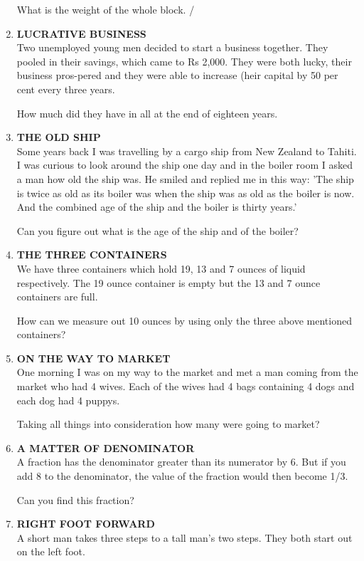 \documentclass[12pt]{article}
\begin{document}
\begin{enumerate}
What is the weight  of the whole  block.  / 
%
\item \textbf{LUCRATIVE  BUSINESS} \\
Two unemployed  young  men  decided  to start  a business together.  They  pooled  in their  savings,  which  came  to Rs 2,000.  They  were  both  lucky,  their  business  pros-pered  and  they  were  able  to increase  (heir  capital  by 50 per cent  every  three  years. 

How  much  did they  have  in all at the end of eighteen years. 
%
\item \textbf{THE  OLD  SHIP} \\
Some  years  back  I was  travelling  by a cargo  ship  from New Zealand  to Tahiti.  I was curious  to look  around  the ship one day and in the boiler  room  I asked  a man  how old the ship  was.  He  smiled  and replied  me in this  way: 'The ship  is twice  as old as its boiler  was when  the ship was as old as the boiler  is now.  And  the  combined  age of the ship  and the boiler  is thirty  years.' 

Can you  figure  out what  is the age of the ship  and of the boiler? 
%
\item \textbf{THE  THREE  CONTAINERS} \\
We have  three  containers  which  hold  19, 13 and  7 ounces  of liquid  respectively.  The  19 ounce  container  is empty  but the 13 and 7 ounce  containers  are full.  

How can we measure  out  10 ounces  by using  only  the three above  mentioned  containers? 
%
\item \textbf{ON  THE  WAY  TO MARKET} \\
One morning  I was on  my way  to the market  and met  a man coming from the market who had 4 wives.  Each  of the  wives  had  4 bags containing  4 dogs  and each  dog had 4 puppys. 

Taking  all things  into  consideration  how  many  were going  to market? 
%
\item \textbf{A  MATTER  OF  DENOMINATOR} \\
A fraction  has the denominator  greater  than  its numerator by 6. But  if you add 8 to the denominator,  the value  of the fraction  would  then  become  1/3.

Can you  find  this fraction? 
%
\item \textbf{RIGHT  FOOT  FORWARD} \\
A short  man  takes  three  steps  to a tall man's  two  steps. They  both  start  out on the left foot.  


\end{enumerate}
\end{document}
